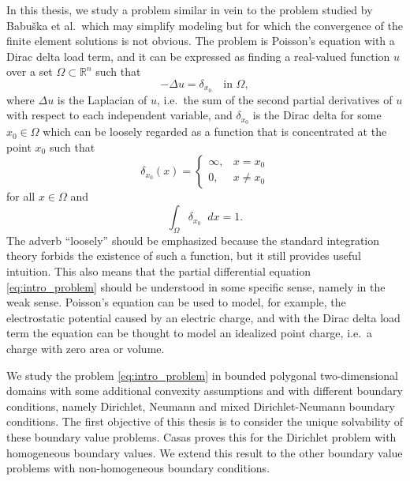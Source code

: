 \documentclass[english, 12pt, a4paper, sci, utf8, a-2b, online]{aaltothesis}
\theoremstyle{definition}
\theoremstyle{plain}
\newcommand*\diff{\mathop{}\!d}
\numberwithin{equation}{section}
\begin{document}
In this thesis, we study a problem similar in vein to the problem
studied by Babu{\v s}ka et al.\ which may simplify modeling but for which
the convergence of the finite element solutions is not obvious.
The problem is Poisson's equation with a Dirac delta load term, and it can
be expressed as finding a real-valued function $u$ over
a set $\Omega \subset \mathbb{R}^n$ such that
\begin{equation}
    \label{eq:intro_problem}
    -\Delta u = \delta_{x_0} \quad \text{in } \Omega,
\end{equation}
where $\Delta u$ is the Laplacian of $u$,
i.e.\ the sum of the second partial derivatives of $u$
with respect to each independent variable,
and $\delta_{x_0}$ is the Dirac delta for some $x_0 \in \Omega$
which can be loosely regarded as a function that is concentrated
at the point $x_0$ such that
\begin{equation*}
    \delta_{x_0}(x) =
    \begin{cases}
        \infty, & x = x_0 \\
        0, & x \neq x_0
    \end{cases}
\end{equation*}
for all $x \in \Omega$ and
\begin{equation*}
    \int_{\Omega} \delta_{x_0} \diff x = 1.
\end{equation*}
The adverb ``loosely'' should be emphasized because the standard integration
theory forbids the existence of such a function, but it still provides useful
intuition. This also means that the partial differential equation 
\eqref{eq:intro_problem} should be
understood in some specific sense, namely in the weak sense.
Poisson's equation can be used to
model, for example, the electrostatic potential caused by an electric charge, and
with the Dirac delta load term the equation can be thought to model an idealized
point charge, i.e.\ a charge with zero area or volume.

We study the problem \eqref{eq:intro_problem}
in bounded polygonal two-dimensional domains
with some additional convexity assumptions
and with different boundary conditions, namely
Dirichlet, Neumann and mixed Dirichlet-Neumann boundary conditions.
The first objective of this thesis is to consider the unique solvability
of these boundary value problems.
Casas \cite{casas1985} proves this for the Dirichlet problem with
homogeneous boundary values. We extend this result to the other boundary 
value problems with non-homogeneous boundary conditions.
\end{document}
